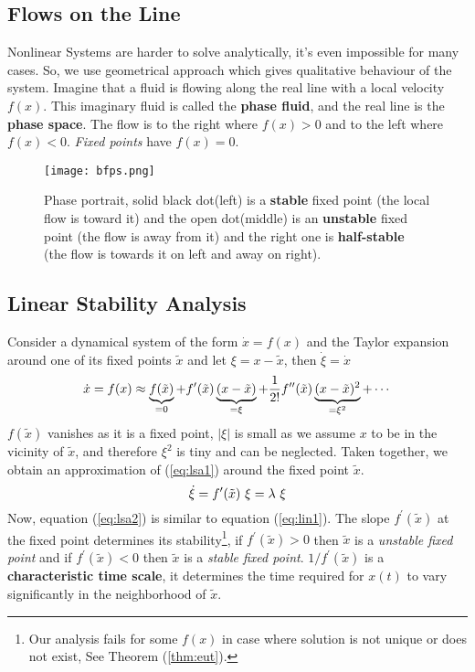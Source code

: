 \subsection{Flows on the Line}
Nonlinear Systems are harder to solve analytically, it's even impossible for many cases.
So, we use geometrical approach which gives qualitative behaviour of the system.
Imagine that a fluid is flowing along the real line with a local velocity $f(x)$.
This imaginary fluid is called the {\textbf{phase fluid}}, and the real line is the {\textbf{phase space}}.
The flow is to the right where $f(x)>0$ and to the left where $f(x)<0$.
\emph{Fixed points} have $f(x)=0$.
\begin{figure}[H]
  \centering
  \texttt{[image: bfps.png]}
  \caption{Phase portrait, solid black dot(left) is a {\textbf{stable}} fixed point (the local flow is toward it) and the open dot(middle) is an {\textbf{unstable}} fixed point (the flow is away from it) and the right one is {\textbf{half-stable}} (the flow is towards it on left and away on right).}
  \label{fig:bfps}
\end{figure}
\subsection{Linear Stability Analysis}
Consider a dynamical system of the form $\dot{x}=f(x)$ and the Taylor expansion around one of its fixed points $\tilde{x}$ and let $\xi=x-\tilde{x}$, then $\dot{\xi}=\dot{x}$
\begin{equation}{\label{eq:lsa1}}
  \dot{x}=f(x) \approx \underbrace{f(\tilde{x})}_{=0}+f^\prime(\tilde{x})\underbrace{(x-\tilde{x})}_{=\xi}+\frac{1}{2!}f^{\prime \prime}(\tilde{x})\underbrace{(x-\tilde{x})^2}_{=\xi^2}+\cdots
\end{equation}
$f(\tilde{x})$ vanishes as it is a fixed point, $|\xi|$ is small as we assume $x$ to be in the vicinity of $\tilde{x}$, and therefore $\xi^2$ is tiny and can be neglected.
Taken together, we obtain an approximation of (\ref{eq:lsa1}) around the fixed point $\tilde{x}$.
\begin{equation}{\label{eq:lsa2}}
  \dot{\xi} = f^\prime(\tilde{x})\ \xi = \lambda\ \xi
\end{equation}
Now, equation (\ref{eq:lsa2}) is similar to equation (\ref{eq:lin1}).
The slope $f^\prime(\tilde{x})$ at the fixed point determines its stability\footnote{Our analysis fails for some $f(x)$ in case where solution is not unique or does not exist, See Theorem (\ref{thm:eut}).}, if $f^\prime(\tilde{x})>0$ then $\tilde{x}$ is a \emph{unstable fixed point} and if $f^\prime(\tilde{x})<0$ then $\tilde{x}$ is a \emph{stable fixed point}.
$1/f^\prime(\tilde{x})$ is a {\textbf{characteristic time scale}}, it determines the time required for $x(t)$ to vary significantly in the neighborhood of $\tilde{x}$.
